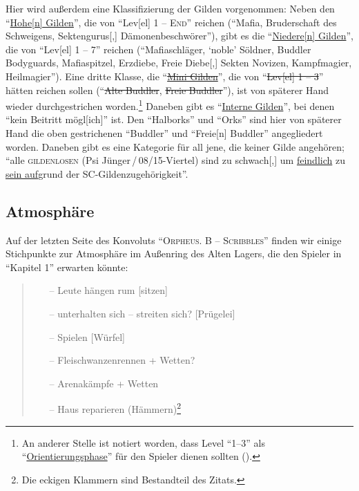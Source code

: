 \documentclass[a5paper,pagesize,numbers=noenddot]{scrbook}
\begin{document}
Hier wird außerdem eine Klassifizierung der Gilden vorgenommen:
Neben den \enquote{\uline{Hohe[n] Gilden}}, die von \enquote{Lev[el] 1 -- \textsc{End}} reichen (\enquote{Mafia, Bruderschaft des Schweigens, Sektengurus[,] Dämonenbeschwörer}), gibt es die \enquote{\uline{Niedere[n] Gilden}}, die von \enquote{Lev[el] 1 -- 7} reichen (\enquote{Mafiaschläger, \enquote{noble} Söldner, Buddler Bodyguards, Mafiaspitzel, Erzdiebe, Freie Diebe[,] Sekten Novizen, Kampfmagier, Heilmagier}).
Eine dritte Klasse, die \enquote{\uline{\sout{Mini Gilden}}}, die von \enquote{\sout{Lev[el] 1 -- 3}} hätten reichen sollen (\enquote{\sout{Alte Buddler}, \sout{Freie Buddler}}), ist von späterer Hand wieder durchgestrichen worden.\footnote{An anderer Stelle ist notiert worden, dass Level \enquote{1--3} als \enquote{\uline{Orientierungsphase}} für den Spieler dienen sollten (\autocite[S.~10]{orpheus_b_scribbles}).}
Daneben gibt es \enquote{\uline{Interne Gilden}}, bei denen \enquote{kein Beitritt mögl[ich]} ist.
Den \enquote{Halborks} und \enquote{Orks} sind hier von späterer Hand die oben gestrichenen \enquote{Buddler} und \enquote{Freie[n] Buddler} angegliedert worden.
Daneben gibt es eine Kategorie für all jene, die keiner Gilde angehören; \enquote{alle \textsc{gildenlosen} (Psi Jünger\,/\,08/15-Viertel) sind zu schwach[,] um \uline{feindlich} zu \uline{sein auf}grund der SC-Gildenzugehörigkeit}.


\subsection{Atmosphäre}\label{sec:orpheus_welt_atmosphaere}
Auf der letzten Seite des Konvoluts \enquote{\textsc{Orpheus. B -- Scribbles}} finden wir einige Stichpunkte zur Atmosphäre im Außenring des Alten Lagers, die den Spieler in \enquote{Kapitel 1} erwarten könnte:

\begin{quote}
   \begin{itemize}
      \item[--] Leute hängen rum [sitzen]
      \item[--] unterhalten sich -- streiten sich? [Prügelei]
      \item[--] Spielen [Würfel]
      \item[--] Fleischwanzenrennen + Wetten?
      \item[--] Arenakämpfe + Wetten
      \item[--] Haus reparieren (Hämmern)\footnote{Die eckigen Klammern sind Bestandteil des Zitats.}
   \end{itemize}
\end{quote}
\end{document}
